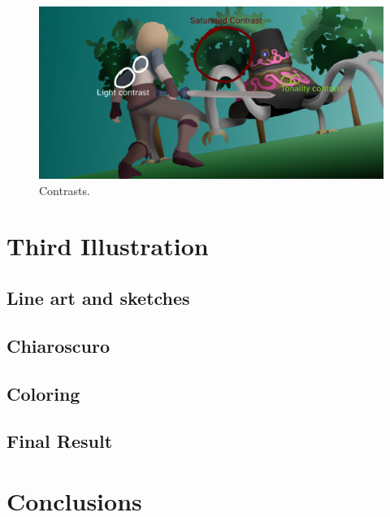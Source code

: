 \documentclass{cup-pan}
\begin{document}
            \begin{figure}[H]
                \includegraphics[width=\textwidth]{Imagenes/Fanart2/Analysis/contraste.png}
                \caption{Contrasts.}
            \end{figure}
\newpage
\newpage
\section{Third Illustration}

    \subsection{Line art and sketches}

    \subsection{Chiaroscuro}

    \subsection{Coloring}

    \subsection{Final Result}
    \newpage
\newpage
\section{Conclusions}

\newpage
\end{document}
